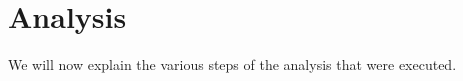 \section{Analysis}
\label{sec:analysis}

We will now explain the various steps of the analysis that were executed.






